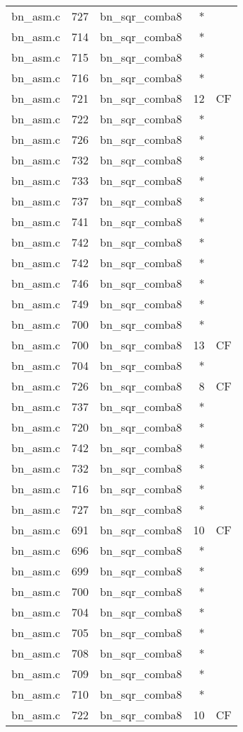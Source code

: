 \begin{table}
\begin{tabular}{lrlrr}
bn\_asm.c& 727&bn\_sqr\_comba8&*&\\
bn\_asm.c& 714&bn\_sqr\_comba8&*&\\
bn\_asm.c& 715&bn\_sqr\_comba8&*&\\
bn\_asm.c& 716&bn\_sqr\_comba8&*&\\
bn\_asm.c& 721&bn\_sqr\_comba8&12&CF\\
bn\_asm.c& 722&bn\_sqr\_comba8&*&\\
bn\_asm.c& 726&bn\_sqr\_comba8&*&\\
bn\_asm.c& 732&bn\_sqr\_comba8&*&\\
bn\_asm.c& 733&bn\_sqr\_comba8&*&\\
bn\_asm.c& 737&bn\_sqr\_comba8&*&\\
bn\_asm.c& 741&bn\_sqr\_comba8&*&\\
bn\_asm.c& 742&bn\_sqr\_comba8&*&\\
bn\_asm.c& 742&bn\_sqr\_comba8&*&\\
bn\_asm.c& 746&bn\_sqr\_comba8&*&\\
bn\_asm.c& 749&bn\_sqr\_comba8&*&\\
bn\_asm.c& 700&bn\_sqr\_comba8&*&\\
bn\_asm.c& 700&bn\_sqr\_comba8&13&CF\\
bn\_asm.c& 704&bn\_sqr\_comba8&*&\\
bn\_asm.c& 726&bn\_sqr\_comba8&8 &CF\\
bn\_asm.c& 737&bn\_sqr\_comba8&*&\\
bn\_asm.c& 720&bn\_sqr\_comba8&*&\\
bn\_asm.c& 742&bn\_sqr\_comba8&*&\\
bn\_asm.c& 732&bn\_sqr\_comba8&*&\\
bn\_asm.c& 716&bn\_sqr\_comba8&*&\\
bn\_asm.c& 727&bn\_sqr\_comba8&*&\\
bn\_asm.c& 691&bn\_sqr\_comba8&10&CF\\
bn\_asm.c& 696&bn\_sqr\_comba8&*&\\
bn\_asm.c& 699&bn\_sqr\_comba8&*&\\
bn\_asm.c& 700&bn\_sqr\_comba8&*&\\
bn\_asm.c& 704&bn\_sqr\_comba8&*&\\
bn\_asm.c& 705&bn\_sqr\_comba8&*&\\
bn\_asm.c& 708&bn\_sqr\_comba8&*&\\
bn\_asm.c& 709&bn\_sqr\_comba8&*&\\
bn\_asm.c& 710&bn\_sqr\_comba8&*&\\
bn\_asm.c& 722&bn\_sqr\_comba8&10&CF\\

\end{tabular}
\end{table}
